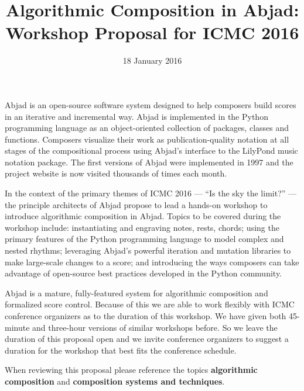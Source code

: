 \documentclass[12pt]{article}
\author{}
\title{Algorithmic Composition in Abjad: \\ Workshop Proposal for ICMC 2016}
\date{18 January 2016}
\begin{document}
\maketitle
\thispagestyle{empty}

Abjad is an open-source software system designed to help composers build scores in an iterative and incremental way. Abjad is implemented in the Python programming language as an object-oriented collection of packages, classes and functions. Composers visualize their work as publication-quality notation at all stages of the compositional process using Abjad's interface to the LilyPond music notation package. The first versions of Abjad were implemented in 1997 and the project website is now visited thousands of times each month.

In the context of the primary themes of ICMC 2016 --- ``Is the sky the limit?'' --- the principle architects of Abjad propose to lead a hands-on workshop to introduce algorithmic composition in Abjad. Topics to be covered during the workshop include: instantiating and engraving notes, rests, chords; using the primary features of the Python programming language to model complex and nested rhythms; leveraging  Abjad's powerful iteration and mutation libraries to make large-scale changes to a score;  
and introducing the ways composers can take advantage of open-source best practices developed in the Python community.

Abjad is a mature, fully-featured system for algorithmic composition and formalized score control. Because of this we are able to work flexibly with ICMC conference organizers as to the duration of this workshop. We have given both 45-minute and three-hour versions of similar workshops before. So we leave the duration of this proposal open and we invite conference organizers to suggest a duration for the workshop that best fits the conference schedule.

When reviewing this proposal please reference the topics \textbf{algorithmic composition} and \textbf{composition systems and techniques}.
\end{document}
